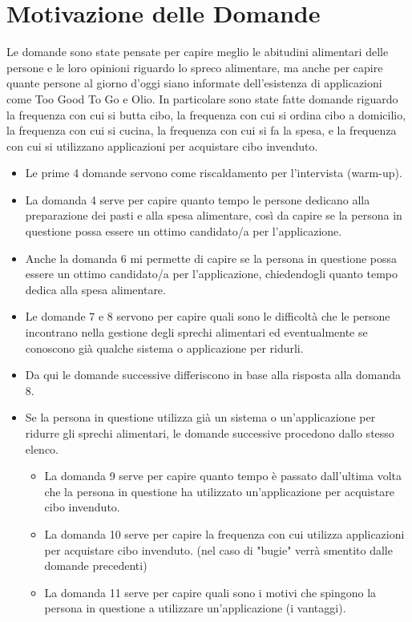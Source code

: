 \documentclass{article}
\begin{document}
\section{Motivazione delle Domande}
Le domande sono state pensate per capire meglio le abitudini alimentari delle persone e le loro opinioni riguardo lo spreco alimentare, ma anche per capire quante persone al giorno d'oggi siano informate dell'esistenza di applicazioni come Too Good To Go e Olio.
In particolare sono state fatte domande riguardo la frequenza con cui si butta cibo, la frequenza con cui si ordina cibo a domicilio, la frequenza con cui si cucina, la frequenza con cui si fa la spesa, e la frequenza con cui si utilizzano applicazioni per acquistare cibo invenduto.
\begin{itemize}
    \item Le prime 4 domande servono come riscaldamento per l'intervista (warm-up).
    \item La domanda 4 serve per capire quanto tempo le persone dedicano alla preparazione dei pasti e alla spesa alimentare, così da capire se la persona in questione possa essere un ottimo candidato/a per l'applicazione.
    \item Anche la domanda 6 mi permette di capire se la persona in questione possa essere un ottimo candidato/a per l'applicazione, chiedendogli quanto tempo dedica alla spesa alimentare.
    \item Le domande 7 e 8 servono per capire quali sono le difficoltà che le persone incontrano nella gestione degli sprechi alimentari ed eventualmente se conoscono già qualche sistema o applicazione per ridurli.
    \item Da qui le domande successive differiscono in base alla risposta alla domanda 8.
    \item Se la persona in questione utilizza già un sistema o un'applicazione per ridurre gli sprechi alimentari, le domande successive procedono dallo stesso elenco.
    \begin{itemize}
        \item La domanda 9 serve per capire quanto tempo è passato dall'ultima volta che la persona in questione ha utilizzato un'applicazione per acquistare cibo invenduto.
        \item La domanda 10 serve per capire la frequenza con cui utilizza applicazioni per acquistare cibo invenduto. (nel caso di "bugie" verrà smentito dalle domande precedenti)
        \item La domanda 11 serve per capire quali sono i motivi che spingono la persona in questione a utilizzare un'applicazione (i vantaggi).

\end{itemize}
\end{itemize}
\end{document}

